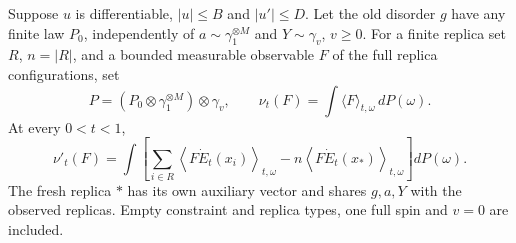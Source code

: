 \begin{theorem}\label{thm:sg-tal:perceptron-disorder-derivative}
  \leanok
Suppose $u$ is differentiable, $|u|\le B$ and $|u'|\le D$. Let the old disorder $g$ have
any finite law $P_0$, independently of $a\sim\gamma_1^{\otimes M}$ and
$Y\sim\gamma_v$, $v\ge0$. For a finite replica set $R$, $n=|R|$, and a bounded measurable
observable $F$ of the full replica configurations, set
\[
 P=(P_0\otimes\gamma_1^{\otimes M})\otimes\gamma_v,\qquad
 \nu_t(F)=\int\langle F\rangle_{t,\omega}\,dP(\omega).
\]
At every $0<t<1$,
\[
 \nu'_t(F)=\int\left[
   \sum_{i\in R}\left\langle F\dot E_t(x_i)\right\rangle_{t,\omega}
   -n\left\langle F\dot E_t(x_*)\right\rangle_{t,\omega}\right]dP(\omega).
\]
The fresh replica $*$ has its own auxiliary vector and shares $g,a,Y$ with the observed
replicas. Empty constraint and replica types, one full spin and $v=0$ are included.
\end{theorem}
